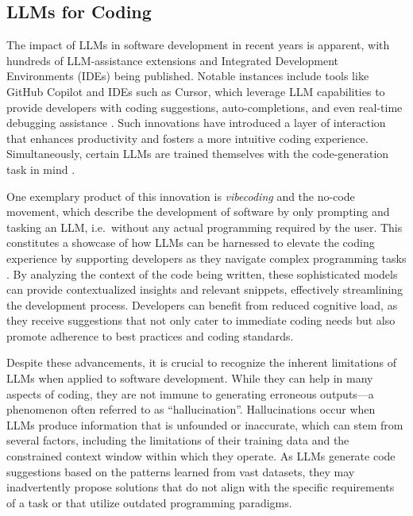 \documentclass[
  a4paper,
]{scrreprt}
\theoremstyle{definition}
\theoremstyle{remark}
\begin{document}
\subsection{LLMs for Coding}\label{sec-llm-coding}

The impact of LLMs in software development in recent years is apparent,
with hundreds of LLM-assistance extensions and Integrated Development
Environments (IDEs) being published. Notable instances include tools
like GitHub Copilot and IDEs such as Cursor, which leverage LLM
capabilities to provide developers with coding suggestions,
auto-completions, and even real-time debugging assistance
\autocite{cursor,ghcopilot}. Such innovations have introduced a layer of
interaction that enhances productivity and fosters a more intuitive
coding experience. Simultaneously, certain LLMs are trained themselves
with the code-generation task in mind
\autocite{nijkamp2023a,nijkamp2023,openai2025a}.

One exemplary product of this innovation is \emph{vibecoding} and the
no-code movement, which describe the development of software by only
prompting and tasking an LLM, i.e.~without any actual programming
required by the user. This constitutes a showcase of how LLMs can be
harnessed to elevate the coding experience by supporting developers as
they navigate complex programming tasks \autocite{sarkar2025}. By
analyzing the context of the code being written, these sophisticated
models can provide contextualized insights and relevant snippets,
effectively streamlining the development process. Developers can benefit
from reduced cognitive load, as they receive suggestions that not only
cater to immediate coding needs but also promote adherence to best
practices and coding standards.

Despite these advancements, it is crucial to recognize the inherent
limitations of LLMs when applied to software development. While they can
help in many aspects of coding, they are not immune to generating
erroneous outputs---a phenomenon often referred to as ``hallucination''.
Hallucinations occur when LLMs produce information that is unfounded or
inaccurate, which can stem from several factors, including the
limitations of their training data and the constrained context window
within which they operate. As LLMs generate code suggestions based on
the patterns learned from vast datasets, they may inadvertently propose
solutions that do not align with the specific requirements of a task or
that utilize outdated programming paradigms.
\end{document}
